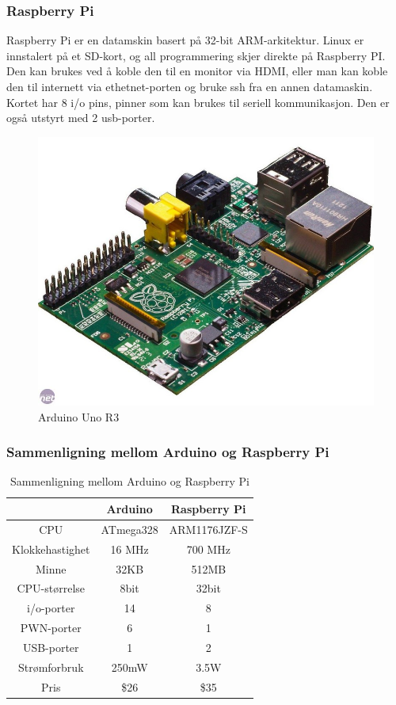 \subsubsection{Raspberry Pi}
Raspberry Pi er en datamskin basert på 32-bit ARM-arkitektur. Linux er innstalert på et SD-kort, og all programmering skjer direkte på Raspberry PI. Den kan brukes ved å koble den til en monitor via HDMI, eller man kan koble den til internett via ethetnet-porten og bruke ssh fra en annen datamaskin. Kortet har 8 i/o pins, pinner som kan brukes til seriell kommunikasjon. Den er også utstyrt med 2 usb-porter.

\begin{figure}[h!]
\centering
\includegraphics[scale = 0.25]{img/pi.jpg}
\caption{Arduino Uno R3}
\end{figure}  

\subsubsection{Sammenligning mellom Arduino og Raspberry Pi}
\begin{table}[h!]
\caption{Sammenligning mellom Arduino og Raspberry Pi}
\centering
\begin{tabular}{ |c |c |c| }
	\hline
   & Arduino & Raspberry Pi \\
	\hline
  CPU & 	ATmega328 & ARM1176JZF-S \\
  Klokkehastighet & 16 MHz & 700 MHz \\
	Minne & 32KB & 512MB\\ 
	CPU-størrelse & 8bit & 32bit\\
	i/o-porter & 14 & 8 \\
	PWN-porter & 6 & 1 \\
	USB-porter & 1 & 2 \\
	Strømforbruk & 250mW & 3.5W\\
	Pris & \$26 & \$35 \\
	\hline  
\end{tabular}
\end{table}


